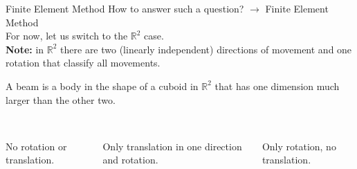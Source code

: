 \documentclass{beamer}
\numberwithin{equation}{aufgabe}
\newcommand\R{\mathbb R}
\begin{document}
\begin{frame}{Finite Element Method}
    How to answer such a question? \pause $\xrightarrow{}$ Finite Element Method\\ \pause
    For now, let us switch to the $\R^2$ case.\\ \pause
    \textbf{Note:} in $\R^2$ there are two (linearly independent) directions of movement and one rotation that classify all movements.
    \pause
    \begin{definition}[Beam]
        A beam is a body in the shape of a cuboid in $\R^2$ that has one dimension much larger than the other two.
    \end{definition}
    \pause
    \begin{definition}[Supports]
        \begin{columns}
        \begin{column}{0.21\textwidth}
            \\
            No rotation or translation.
        \end{column}
        \pause
        \begin{column}{0.3\textwidth}
            \\
            Only translation in one direction and rotation.
        \end{column}
        \pause
        \begin{column}{0.3\textwidth}
            \\
            Only rotation, no translation.
        \end{column}
        \end{columns}
    \end{definition}

\end{frame}
\end{document}
